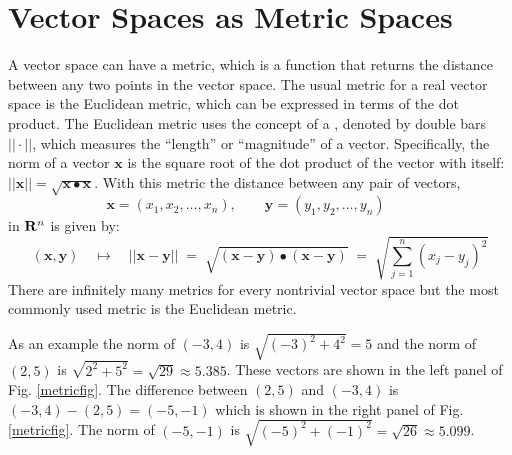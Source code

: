 \section{Vector Spaces as Metric Spaces}\label{metricSpace}

   A vector space can have a metric, which is a function that returns the 
distance between any two points in the vector space.  The usual metric for a 
real vector space is the Euclidean metric, which can be expressed in terms of 
the dot product.  The Euclidean metric uses the concept of a , 
denoted by double bars $|| \cdot ||$, which measures the ``length'' or 
``magnitude'' of a vector.  Specifically, the norm of a vector $\mathbf{x}$ is 
the square root of the dot product of the vector with itself: $||\mathbf{x}|| = 
\sqrt{\mathbf{x} \bullet \mathbf{x}}$.  With this metric the distance between 
any pair of vectors,
\begin{equation*}
\mathbf{x} = (x_1, x_2, \ldots, x_n), \qquad
\mathbf{y} = (y_1, y_2, \ldots, y_n) \qquad
\end{equation*}
in ${\bf R}^n$ is given by:
\begin{equation*}
\left(\mathbf{x}, \mathbf{y}\right) \quad \mapsto \quad
|| \mathbf{x} - \mathbf{y} || \; = \; 
\sqrt{ (\mathbf{x} - \mathbf{y}) \bullet (\mathbf{x} - \mathbf{y}) }
\; = \;  \sqrt{ \sum_{j=1}^n (x_j - y_j)^2 }
\end{equation*}
There are infinitely many metrics for every nontrivial vector space but the 
most commonly used metric is the Euclidean metric.

   As an example the norm of $(-3,4)$ is $\sqrt{(-3)^2+4^2} = 5$ and the norm 
of $(2,5)$ is $\sqrt{2^2+5^2} = \sqrt{29} \approx 5.385$.  These vectors are 
shown in the left panel of Fig. \ref{metricfig}.  The difference between 
$(2,5)$ and $(-3,4)$ is $(-3,4) - (2,5) = (-5,-1)$ which is shown in the right 
panel of Fig. \ref{metricfig}.  The norm of $(-5,-1)$ is $\sqrt{(-5)^2+(-1)^2} 
= \sqrt{26} \approx 5.099$.

